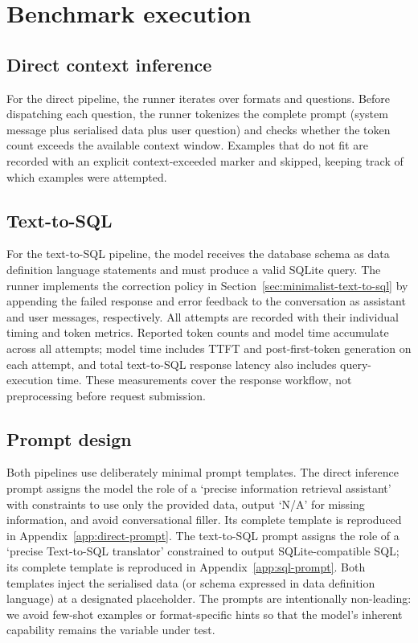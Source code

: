 \section{Benchmark execution}

\subsection{Direct context inference}

For the direct pipeline, the runner iterates over formats and questions. Before dispatching each question,
the runner tokenizes the complete prompt (system message plus serialised data plus user question) and checks
whether the token count exceeds the available context window. Examples that do not fit are recorded with an
explicit context-exceeded marker and skipped, keeping track of which examples were attempted.

\subsection{Text-to-SQL}

For the text-to-SQL pipeline, the model receives the database schema as data definition language statements
and must produce a valid SQLite query. The runner implements the correction policy in
Section~\ref{sec:minimalist-text-to-sql} by appending the failed response and error feedback to the
conversation as assistant and user messages, respectively. All attempts are recorded with their individual
timing and token metrics. Reported token counts and model time accumulate across all attempts; model time
includes TTFT and post-first-token generation on each attempt, and total text-to-SQL response latency also
includes query-execution time. These measurements cover the response workflow, not preprocessing before
request submission.

\subsection{Prompt design}

Both pipelines use deliberately minimal prompt templates. The direct inference prompt assigns the model the
role of a `precise information retrieval assistant' with constraints to use only the provided data, output
`N/A' for missing information, and avoid conversational filler. Its complete template is reproduced in
Appendix~\ref{app:direct-prompt}. The text-to-SQL prompt assigns the role of a `precise Text-to-SQL
translator' constrained to output SQLite-compatible SQL; its complete template is reproduced in
Appendix~\ref{app:sql-prompt}. Both templates inject the serialised data (or schema expressed in data
definition language) at a designated placeholder. The prompts are intentionally non-leading: we avoid
few-shot examples or format-specific hints so that the model's inherent capability remains the variable under test.

